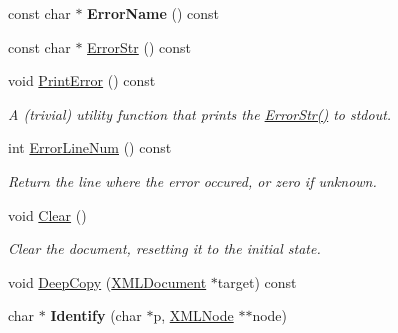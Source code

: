 \begin{DoxyCompactItemize}
const char $\ast$ {\bfseries Error\+Name} () const
\item 
const char $\ast$ \hyperlink{classCPlantBox_1_1tinyxml2_1_1XMLDocument_a62a0f2df44e9c002762f97c28db165d1}{Error\+Str} () const
\item 
\mbox{\label{classCPlantBox_1_1tinyxml2_1_1XMLDocument_abd5f3565f819b6e977e0c4583c1ba329}} 
void \hyperlink{classCPlantBox_1_1tinyxml2_1_1XMLDocument_abd5f3565f819b6e977e0c4583c1ba329}{Print\+Error} () const
\begin{DoxyCompactList}\small\item\em A (trivial) utility function that prints the \hyperlink{classCPlantBox_1_1tinyxml2_1_1XMLDocument_a62a0f2df44e9c002762f97c28db165d1}{Error\+Str()} to stdout. \end{DoxyCompactList}\item 
\mbox{\label{classCPlantBox_1_1tinyxml2_1_1XMLDocument_a1c26ef67810586ca5c6a80834ff472e1}} 
int \hyperlink{classCPlantBox_1_1tinyxml2_1_1XMLDocument_a1c26ef67810586ca5c6a80834ff472e1}{Error\+Line\+Num} () const
\begin{DoxyCompactList}\small\item\em Return the line where the error occured, or zero if unknown. \end{DoxyCompactList}\item 
\mbox{\label{classCPlantBox_1_1tinyxml2_1_1XMLDocument_a5b6b65c312e2507d2bf41f0fc616168a}} 
void \hyperlink{classCPlantBox_1_1tinyxml2_1_1XMLDocument_a5b6b65c312e2507d2bf41f0fc616168a}{Clear} ()
\begin{DoxyCompactList}\small\item\em Clear the document, resetting it to the initial state. \end{DoxyCompactList}\item 
void \hyperlink{classCPlantBox_1_1tinyxml2_1_1XMLDocument_adea3308f51d844c580cc29bb7bc5b32b}{Deep\+Copy} (\hyperlink{classCPlantBox_1_1tinyxml2_1_1XMLDocument}{X\+M\+L\+Document} $\ast$target) const
\item 
\mbox{\label{classCPlantBox_1_1tinyxml2_1_1XMLDocument_a76b1f8f11d6e9b7b2d8ff1982948f5fe}} 
char $\ast$ {\bfseries Identify} (char $\ast$p, \hyperlink{classCPlantBox_1_1tinyxml2_1_1XMLNode}{X\+M\+L\+Node} $\ast$$\ast$node)
$$
\end{DoxyCompactItemize}
